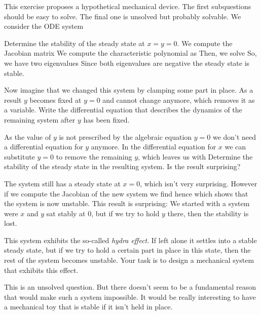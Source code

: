 This exercise proposes a hypothetical mechanical device. The first subquestions should be easy to solve. The final one is unsolved but probably solvable. We consider the ODE system

\subquestion 
Determine the stability of the steady state at $x=y=0$.
\solution
We compute the Jacobian matrix
We compute the characteristic polynomial as 
Then, we solve 
So, we have two eigenvalues 
Since both eigenvalues are negative the steady state is stable. 

\subquestion
Now imagine that we changed this system by clamping some part in place. As a result $y$ becomes fixed at $y=0$ and cannot change anymore, which removes it as a variable. Write the differential equation that describes the dynamics of the remaining system after $y$ has been fixed. 

\solution
As the value of $y$ is not prescribed by the algebraic equation $y=0$ we don't need a differential equation for $y$ anymore. In the differential equation for $x$ we can substitute $y=0$ to remove the remaining $y$, which leaves us with 
\subquestion 
Determine the stability of the steady state in the resulting system. Is the result surprising?

\solution
The system still has a steady state at $x=0$, which isn't very surprising. However if we compute the Jacobian of the new system we find
hence
which shows that the system is now unstable. This result is surprising: We started with a system were $x$ and $y$ sat stably at 0, but if we try to hold $y$ there, then the stability is lost. 

\subquestion
This system exhibits the so-called \emph{hydra effect}. If left alone it settles into a stable steady state, but if we try to hold a certain part in place in this state, then the rest of the system becomes unstable. Your task is to design a mechanical system that exhibits this effect. 

\solution
This is an unsolved question. But there doesn't seem to be a fundamental reason that would make such a system impossible. It would be really interesting to have a mechanical toy that is stable if it isn't held in place.
